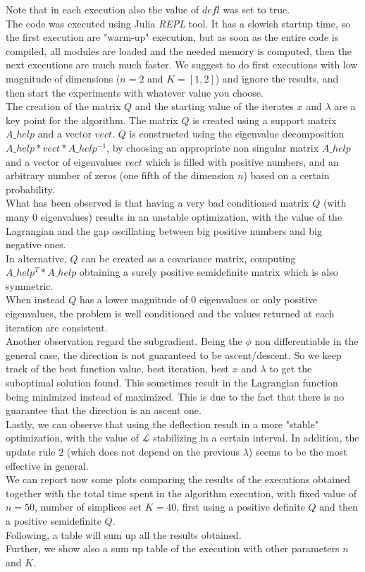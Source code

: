 \documentclass[notitlepage]{article}
\begin{document}
Note that in each execution also the value of $defl$ was set to true.\\
The code was executed using Julia \textit{REPL} tool. It has a slowish startup time, so the first execution are "warm-up" execution, but as soon as the entire code is compiled, all modules are loaded and the needed memory is computed, 
then the next executions are much much faster. We suggest to do first executions with low magnitude of dimensions ($n=2$ and $K=\left[1,2\right]$) and ignore the results, and then start the experiments with whatever value you choose.\\
The creation of the matrix $Q$ and the starting value of the iterates $x$ and $\lambda$ are a key point for the algorithm. The matrix $Q$ is created using a support matrix $A\_help$ and a vector $vect$. $Q$ is 
constructed using the eigenvalue decomposition $A\_help * vect * A\_help^{-1}$, by choosing an appropriate non singular matrix $A\_help$ and a vector of eigenvalues $vect$ which is filled with positive numbers,
and an arbitrary number of zeros (one fifth of the dimension $n$) based on a certain probability.\\
What has been observed is that having a very bad conditioned matrix $Q$ (with many $0$ eigenvalues) results in an unstable optimization, with the value of the Lagrangian and the gap oscillating between big positive 
numbers and big negative ones.\\
In alternative, $Q$ can be created as a covariance matrix, computing $A\_help^T * A\_help$ obtaining a surely positive semidefinite matrix which is also symmetric.\\
When instead $Q$ has a lower magnitude of $0$ eigenvalues or only positive eigenvalues, the problem is well conditioned and the values returned at each iteration are consistent.\\
Another observation regard the subgradient. Being the $\phi$ non differentiable in the general case, the direction is not guaranteed to be ascent/descent. So we keep track of the best function value, best iteration, best $x$ 
and $\lambda$ to get the suboptimal solution found. This sometimes result in the Lagrangian function being minimized instead of maximized. This is due to the fact that there is no guarantee that the direction is an ascent one.\\
Lastly, we can observe that using the deflection result in a more "stable" optimization, with the value of $\mathcal{L}$ stabilizing in a certain interval. In addition, the update rule $2$ (which does not depend on the previous $\lambda$) 
seems to be the most effective in general.\\[1em]
We can report now some plots comparing the results of the executions obtained together with the total time spent in the algorithm execution, with fixed value of $n=50$, number of simplices set $K=40$, first using a positive definite $Q$
and then a positive semidefinite $Q$.\\
Following, a table will sum up all the results obtained.\\
Further, we show also a sum up table of the execution with other parameters $n$ and $K$.\\
\end{document}
